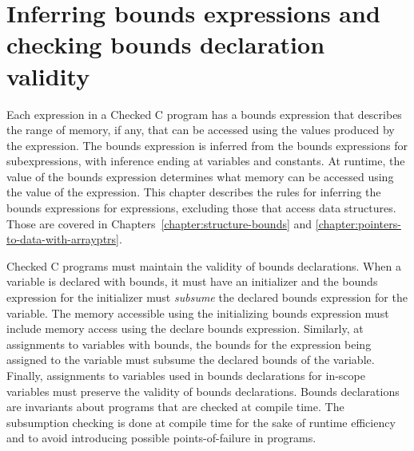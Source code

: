 
\chapter{Inferring bounds expressions and checking bounds declaration validity}
\label{chapter:checking-bounds}

Each expression in a Checked C program has a bounds expression
that describes the range of memory, if any, that can be accessed using
the values produced by the expression.  The bounds expression
is inferred from the bounds expressions for subexpressions, with inference 
ending at variables and constants.  At runtime, the value of the
bounds expression determines what memory can be accessed using the
value of the expression.
This chapter describes the rules for inferring the bounds expressions for
expressions, excluding those that access data structures. Those are covered in
Chapters~\ref{chapter:structure-bounds} and 
\ref{chapter:pointers-to-data-with-arrayptrs}.

Checked C programs must maintain the validity of bounds declarations.
When a variable is declared with bounds, it must have an initializer
and the bounds expression for the initializer must {\em subsume} the declared bounds
expression for the variable.   The memory accessible using the 
initializing bounds expression must include memory access using the
declare bounds expression. 
Similarly, at assignments to variables with bounds, the 
bounds for the expression being assigned to the variable 
must subsume the declared bounds of the variable.
Finally, assignments to variables used in bounds 
declarations for in-scope variables must preserve
the validity of bounds declarations.
Bounds declarations are invariants about programs that are checked
at compile time.
The subsumption checking is done at compile time for
the sake of runtime efficiency and to avoid introducing
possible points-of-failure in programs.

